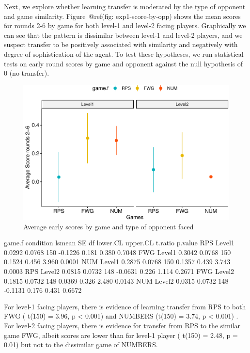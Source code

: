 \documentclass[man,floatsintext]{apa6}
\begin{document}
Next, we explore whether learning transfer is moderated by the type of opponent and game similarity. Figure~@ref(fig: exp1-score-by-opp) shows the mean scores for rounds 2-6 by game for both level-1 and level-2 facing players. Graphically we can see that the pattern is dissimilar between level-1 and level-2 players, and we suspect transfer to be positively associated with similarity and negatively with degree of sophistication of the agent. To test these hypotheses, we run statistical tests on early round scores by game and opponent against the null hypothesis of 0 (no transfer).

\begin{figure}

{\centering \includegraphics{draft_report_v1_files/figure-latex/exp1-score-by-opp-1} 

}

\caption{Average early scores by game and type of opponent faced}\label{fig:exp1-score-by-opp}
\end{figure}

game.f condition lsmean SE df lower.CL upper.CL t.ratio p.value
RPS Level1 0.0292 0.0768 150 -0.1226 0.181 0.380 0.7048
FWG Level1 0.3042 0.0768 150 0.1524 0.456 3.960 0.0001
NUM Level1 0.2875 0.0768 150 0.1357 0.439 3.743 0.0003
RPS Level2 0.0815 0.0732 148 -0.0631 0.226 1.114 0.2671
FWG Level2 0.1815 0.0732 148 0.0369 0.326 2.480 0.0143
NUM Level2 0.0315 0.0732 148 -0.1131 0.176 0.431 0.6672

For level-1 facing players, there is evidence of learning transfer from RPS to both FWG ( t(150) = 3.96, p \textless{} 0.001) and NUMBERS (t(150) = 3.74, p \textless{} 0.001) . For level-2 facing players, there is evidence for transfer from RPS to the similar game FWG, albeit scores are lower than for level-1 player ( t(150) = 2.48, p = 0.01) but not to the dissimilar game of NUMBERS.
\end{document}
